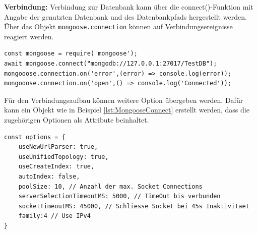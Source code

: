 \newpage
\noindent
\textbf{Verbindung:}
Verbindung zur Datenbank kann über die connect()-Funktion mit Angabe der genutzten Datenbank und des Datenbankpfads hergestellt werden. 
Über das Objekt \texttt{mongoose.connection} können auf Verbindungsereignisse reagiert werden.
\newline

\begin{lstlisting}[caption=Mongoose: Verbindung zur Datenbank aufbauen,
label=lst:MongooseConnect]
const mongoose = require('mongoose');
await mongoose.connect("mongodb://127.0.0.1:27017/TestDB");
mongooose.connection.on('error',(error) => console.log(error));
mongooose.connection.on('open',() => console.log('Connected'));
\end{lstlisting}

\noindent
Für den Verbindungsaufbau können weitere Option übergeben werden. Dafür kann ein Objekt wie in Beispiel \ref{lst:MongooseConnect} erstellt werden, dass die zugehörigen Optionen als Attribute beinhaltet.
\newline

\begin{lstlisting}[caption=Mongoose Verbindungsoptionen \protect \footnotemark  ,label=lst:MongooseConnect]
const options = {
	useNewUrlParser: true,
	useUnifiedTopology: true,
	useCreateIndex: true,
	autoIndex: false,
	poolSize: 10, // Anzahl der max. Socket Connections
	serverSelectionTimeoutMS: 5000, // TimeOut bis verbunden
	socketTimeoutMS: 45000, // Schliesse Socket bei 45s Inaktivitaet
	family:4 // Use IPv4
}
\end{lstlisting}


